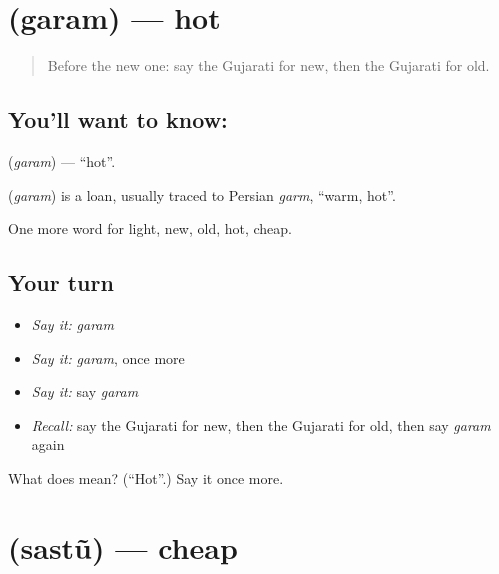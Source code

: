 \section[\texorpdfstring{\gu{ગરમ} (garam)}{ગરમ (garam)}]{ (garam) — hot}

\label{lesson:GU-C73-hot}



\begin{quote}
Before the new one: say the Gujarati for new, then the Gujarati for old.
\end{quote}

\subsection*{You'll want to know: }
\textbf{} (\emph{garam}) — \textquotedblleft{}hot\textquotedblright{}.

\begin{cousinweb}
\textbf{} (\emph{garam}) is a loan, usually traced to Persian \emph{garm}, \textquotedblleft{}warm, hot\textquotedblright{}.
\end{cousinweb}

\begin{grammarlens}[title={What you've built}]
One more word for light, new, old, hot, cheap.
\end{grammarlens}

\subsection*{Your turn}
\begin{itemize}
\raggedright
  \item \emph{Say it:} \emph{garam}
  \item \emph{Say it:} \emph{garam}, once more
  \item \emph{Say it:} say \emph{garam}
  \item \emph{Recall:} say the Gujarati for new, then the Gujarati for old, then say \emph{garam} again
\end{itemize}

\begin{tcolorbox}[breakable,colback=teal!4,colframe=teal!35!black,title={Before you move on}]
What does  mean? (\textquotedblleft{}Hot\textquotedblright{}.) Say it once more.
\end{tcolorbox}
\section[\texorpdfstring{\gu{સસ્તું} (sastũ)}{સસ્તું (sastũ)}]{ (sastũ) — cheap}

